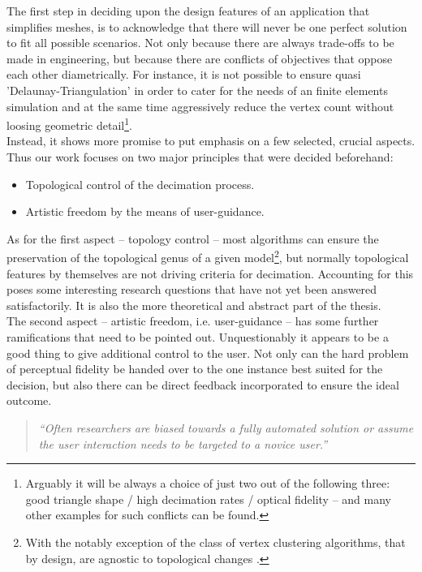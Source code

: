 The first step in deciding upon the design features of an application that simplifies meshes, is to acknowledge that there will never be one perfect solution to fit all possible scenarios.
Not only because there are always trade-offs to be made in engineering, but because there are conflicts of objectives that oppose each other diametrically.
For instance, it is not possible to ensure quasi 'Delaunay-Triangulation' in order to cater for the needs of an finite elements simulation and at the same time aggressively reduce the vertex count without loosing geometric detail\footnote{ Arguably it will be always a choice of just two out of the following three: good triangle shape / high decimation rates / optical fidelity -- and many other examples for such conflicts can be found.}.\\
 Instead, it shows more promise to put emphasis on a few selected, crucial aspects.
Thus our work focuses on two major principles that were decided beforehand:
\begin{itemize}
    \item Topological control of the decimation process.
    \item Artistic freedom by the means of user-guidance.
\end{itemize}
As for the first aspect -- topology control -- most algorithms can ensure the preservation of the topological genus of a given model\footnote{ With the notably exception of the class of vertex clustering algorithms, that by design, are agnostic to topological changes \citep[cf. the original paper by][]{Rossignac1993}.}, but normally topological features by themselves are not driving criteria for decimation.
Accounting for this poses some interesting research questions that have not yet been answered satisfactorily.
It is also the more theoretical and abstract part of the thesis.\\
The second aspect -- artistic freedom, i.e. user-guidance -- has some further ramifications that need to be pointed out.
Unquestionably it appears to be a good thing to give additional control to the user.
Not only can the hard problem of perceptual fidelity be handed over to the one instance best suited for the decision, but also there can be direct feedback incorporated to ensure the ideal outcome.
\begin{quote} \textit{``Often researchers are biased towards a fully automated solution or assume the user interaction needs to be targeted to a novice user.''} \citep[p.195]{Sylwan2011} \end{quote}
